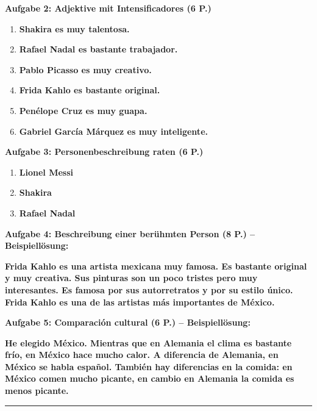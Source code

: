 \documentclass[11pt,a4paper]{article}
\newcommand{\lsg}[1]{\textcolor{loesung}{\textbf{#1}}}
\begin{document}
\begin{gruppeBbox}
\vspace{0.5em}

\textbf{Aufgabe 2: Adjektive mit Intensificadores (6 P.)}
\begin{enumerate}[label=\alph*), leftmargin=2em, nosep]
    \item \lsg{Shakira es muy talentosa.}
    \item \lsg{Rafael Nadal es bastante trabajador.}
    \item \lsg{Pablo Picasso es muy creativo.}
    \item \lsg{Frida Kahlo es bastante original.}
    \item \lsg{Penélope Cruz es muy guapa.}
    \item \lsg{Gabriel García Márquez es muy inteligente.}
\end{enumerate}

\vspace{0.5em}

\textbf{Aufgabe 3: Personenbeschreibung raten (6 P.)}
\begin{enumerate}[label=\alph*), leftmargin=2em, nosep]
    \item \lsg{Lionel Messi}
    \item \lsg{Shakira}
    \item \lsg{Rafael Nadal}
\end{enumerate}

\vspace{0.5em}

\textbf{Aufgabe 4: Beschreibung einer berühmten Person (8 P.) -- Beispiellösung:}

\lsg{Frida Kahlo es una artista mexicana muy famosa. Es bastante original y muy creativa. Sus pinturas son un poco tristes pero muy interesantes. Es famosa por sus autorretratos y por su estilo único. Frida Kahlo es una de las artistas más importantes de México.}

\vspace{0.5em}

\textbf{Aufgabe 5: Comparación cultural (6 P.) -- Beispiellösung:}

\lsg{He elegido México. Mientras que en Alemania el clima es bastante frío, en México hace mucho calor. A diferencia de Alemania, en México se habla español. También hay diferencias en la comida: en México comen mucho picante, en cambio en Alemania la comida es menos picante.}

\end{gruppeBbox}

\vspace{1em}
\hrule
\vspace{0.3em}
\end{document}
